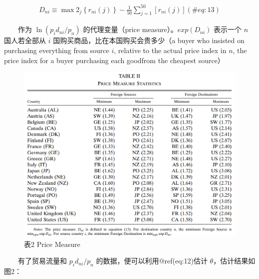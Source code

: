 \documentclass[]{tufte-handout}
\begin{document}
\begin{align}
D_{n i} \equiv \max 2_{j}\left\{r_{n i}(j)\right\}-\frac{1}{50}\sum_{j=1}^{50}\left[r_{n i}(j)\right] (\#eq:13)
\end{align}

　　作为 \(\ln ({p_{i} d_{n i}}/{p_{n}})\) 的代理变量（price
measure）。\(exp(D_{n i})\) 表示一个 \(n\) 国人若全部从 \(i\)
国购买商品，比在本国购买会贵多少（a buyer who insisted on purchasing
everything from source \(i\), relative to the actual price index in
\(n\), the price index for a buyer purchasing each goodfrom the cheapest
source）

\begin{figure}

{\centering \includegraphics[width=1\linewidth]{Figures/Table2} 

}

\caption[表2 Price Measure]{表2 Price Measure}\label{fig:t2}
\end{figure}

　　有了贸易流量和 \({p_{i} d_{n i}}/{p_{n}}\)
的数据，便可以利用@ref(eq:12)估计 \(\theta\)，估计结果如图2：
\end{document}
